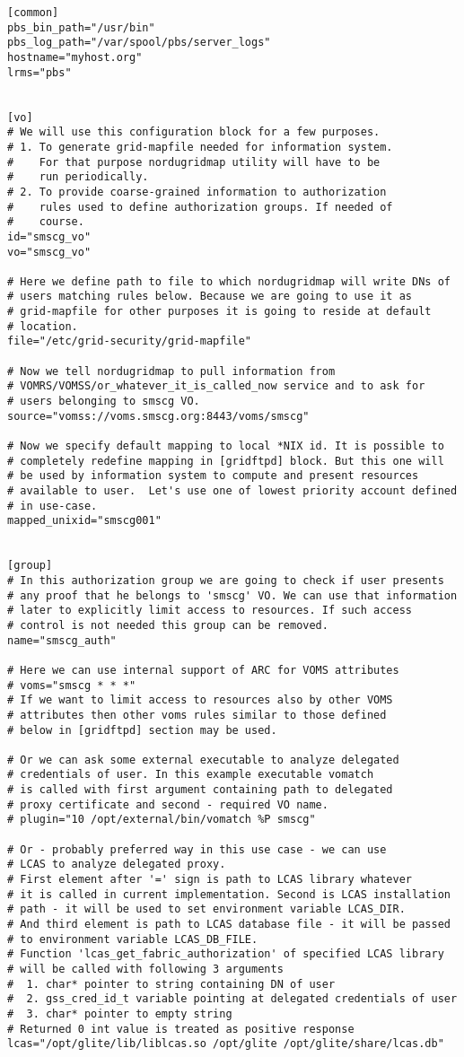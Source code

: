 \documentclass{article}
\begin{document}
\begin{verbatim}
[common]
pbs_bin_path="/usr/bin"
pbs_log_path="/var/spool/pbs/server_logs"
hostname="myhost.org"
lrms="pbs"


[vo]
# We will use this configuration block for a few purposes.
# 1. To generate grid-mapfile needed for information system.
#    For that purpose nordugridmap utility will have to be 
#    run periodically.
# 2. To provide coarse-grained information to authorization 
#    rules used to define authorization groups. If needed of
#    course.
id="smscg_vo"
vo="smscg_vo"

# Here we define path to file to which nordugridmap will write DNs of
# users matching rules below. Because we are going to use it as
# grid-mapfile for other purposes it is going to reside at default
# location.  
file="/etc/grid-security/grid-mapfile"

# Now we tell nordugridmap to pull information from
# VOMRS/VOMSS/or_whatever_it_is_called_now service and to ask for
# users belonging to smscg VO.
source="vomss://voms.smscg.org:8443/voms/smscg"

# Now we specify default mapping to local *NIX id. It is possible to
# completely redefine mapping in [gridftpd] block. But this one will
# be used by information system to compute and present resources
# available to user.  Let's use one of lowest priority account defined
# in use-case.
mapped_unixid="smscg001"


[group]
# In this authorization group we are going to check if user presents
# any proof that he belongs to 'smscg' VO. We can use that information 
# later to explicitly limit access to resources. If such access 
# control is not needed this group can be removed.
name="smscg_auth"

# Here we can use internal support of ARC for VOMS attributes
# voms="smscg * * *"
# If we want to limit access to resources also by other VOMS
# attributes then other voms rules similar to those defined
# below in [gridftpd] section may be used.

# Or we can ask some external executable to analyze delegated
# credentials of user. In this example executable vomatch 
# is called with first argument containing path to delegated
# proxy certificate and second - required VO name.
# plugin="10 /opt/external/bin/vomatch %P smscg"

# Or - probably preferred way in this use case - we can use 
# LCAS to analyze delegated proxy.
# First element after '=' sign is path to LCAS library whatever
# it is called in current implementation. Second is LCAS installation
# path - it will be used to set environment variable LCAS_DIR.
# And third element is path to LCAS database file - it will be passed
# to environment variable LCAS_DB_FILE.
# Function 'lcas_get_fabric_authorization' of specified LCAS library
# will be called with following 3 arguments
#  1. char* pointer to string containing DN of user
#  2. gss_cred_id_t variable pointing at delegated credentials of user
#  3. char* pointer to empty string
# Returned 0 int value is treated as positive response
lcas="/opt/glite/lib/liblcas.so /opt/glite /opt/glite/share/lcas.db"


\end{verbatim}
\end{document}
